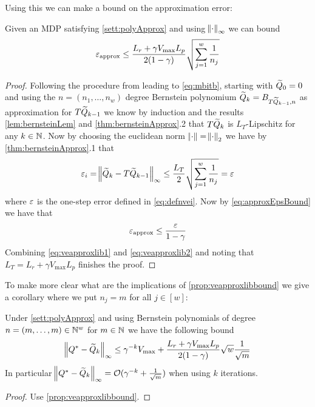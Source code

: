 Using this we can make a bound on the approximation error:

\begin{prop}
  Given an MDP satisfying \cref{sett:polyApprox} and using $\norm{\cdot}_\infty$
  we can bound
  \[ \varepsilon_{\mathrm{approx}} \leq \frac{L_r + \gamma V_{\max} L_p}{2(1-\gamma)}
  \sqrt{\sum_{j=1}^w \frac{1}{n_j}} \]
  \label{prop:veapproxlibbound}
\end{prop}
\begin{proof}
  Following the procedure from leading to \cref{eq:mbitb},
  starting with $\widetilde{Q}_0 = 0$
  and using the $n = (n_1, \dots, n_w)$ degree Bernstein polynomium
  $\widetilde{Q}_{k} = B_{T\widetilde{Q}_{k-1}, n}$ as approximation for $T\widetilde{Q}_{k-1}$
  we know by induction and
  the results \cref{lem:bernsteinLem}
  and \cref{thm:bernsteinApprox}.2 that $T\widetilde{Q}_k$ is
  $L_T$-Lipschitz for any $k \in \mathbb{N}$.
  Now by choosing the euclidean norm $\norm{\cdot} = \norm{\cdot}_2$
  we have by \cref{thm:bernsteinApprox}.1 that
  \begin{equation}
    \varepsilon_i = \norm{\widetilde{Q}_k - T\widetilde{Q}_{k-1}}_\infty
    \leq \frac{L_T}{2} \sqrt{\sum_{j=1}^w \frac{1}{n_j}} = \varepsilon
    \label{eq:veapproxlib1}
  \end{equation}
  where $\varepsilon$ is the one-step error defined in \cref{eq:defnvei}.
  Now by \cref{eq:approxEpsBound}
  we have that
  \begin{equation}
    \varepsilon_{\mathrm{approx}} \leq \frac{\varepsilon}{1-\gamma}
    \label{eq:veapproxlib2}
  \end{equation}
  Combining \cref{eq:veapproxlib1} and \cref{eq:veapproxlib2} and noting
  that $L_T = L_r + \gamma V_{\max} L_p$ finishes the proof.
\end{proof}

To make more clear what are the implications of \cref{prop:veapproxlibbound}
we give a corollary where we put $n_j = m$ for all $j \in [w]$:

\begin{cor}
  Under \cref{sett:polyApprox} and using Bernstein polynomials of degree
  $n = (m, \dots, m) \in \mathbb{N}^w$ for $m \in \mathbb{N}$ we have the following bound
  \[ \norm{Q^* - \widetilde{Q}_k}_\infty \leq \gamma^{-k} V_{\max}
    + \frac{L_r + \gamma V_{\max} L_p}{2(1-\gamma)} \sqrt{w}
  \frac{1}{\sqrt{m}} \]
  In particular $\norm{Q^* - \widetilde{Q}_k}_\infty
  = \mathcal{O}(\gamma^{-k} + \frac{1}{\sqrt{m}})$
  when using $k$ iterations.
  \label{cor:libbound}
\end{cor}
\begin{proof}
  Use \cref{prop:veapproxlibbound}.
\end{proof}

